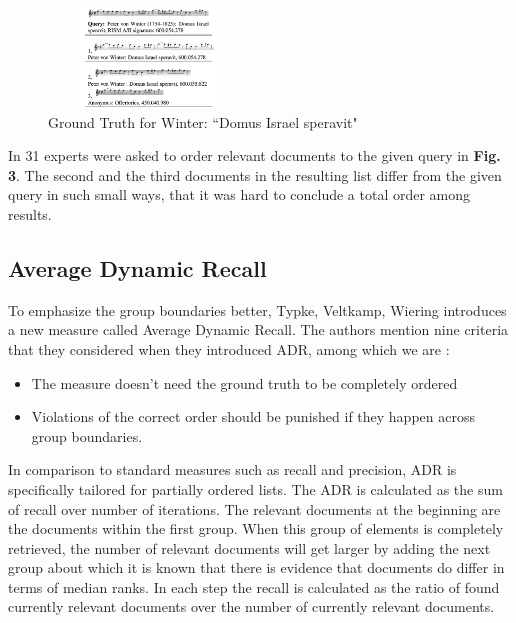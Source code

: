 \documentclass{llncs}
\begin{document}
\begin{itemize}
 		\begin{figure}[h!]
			\centering
			\includegraphics[width=200px,height=100px,keepaspectratio]{one_of_two_point_four_point_four}
			\caption{Ground Truth for Winter: “Domus Israel speravit" \cite{two_point_four_point_four}}
		\end{figure}


 		 In \cite{two_point_four_point_four} 31 experts were asked to order relevant documents to the given query in \textbf{Fig. 3}. The second and the third documents in the resulting list differ from the given query in such small ways, that it was hard to conclude a total order among results.

		\subsection{Average Dynamic Recall}

			To emphasize the group boundaries better, Typke, Veltkamp, Wiering \cite{three}introduces a new measure called Average Dynamic Recall. The authors mention nine criteria that they considered when they introduced ADR, among which we are :

			\begin{itemize}
				\item The measure doesn't need the ground truth to be completely ordered
				\item Violations of the correct order should be punished if they happen across group boundaries.
			\end{itemize}

			In comparison to standard measures such as recall and precision, ADR is specifically tailored for partially ordered lists.
			The ADR is calculated as the sum of recall over number of iterations. The relevant documents  at the beginning are the  documents within the first group. When this group of elements is completely retrieved, the number of relevant documents will get larger by adding the next group about which it is known that there is evidence that documents do differ in terms of median ranks. In each step the recall is calculated as the ratio of found currently relevant documents over the number of currently relevant documents.


\end{itemize}
\end{document}
